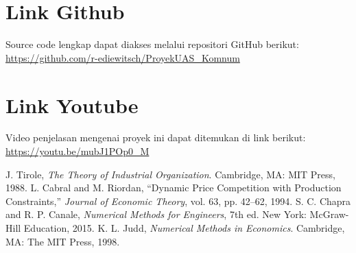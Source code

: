 \documentclass[conference]{IEEEtran}
\begin{document}
\section{Link Github}
Source code lengkap dapat diakses melalui repositori GitHub berikut:
\url{https://github.com/r-ediewitsch/ProyekUAS_Komnum}

\section{Link Youtube}
Video penjelasan mengenai proyek ini dapat ditemukan di link berikut:
\url{https://youtu.be/mubJ1POp0_M}

\begin{thebibliography}{00}
 J. Tirole, \textit{The Theory of Industrial Organization}. Cambridge, MA: MIT Press, 1988.
 L. Cabral and M. Riordan, ``Dynamic Price Competition with Production Constraints,'' \textit{Journal of Economic Theory}, vol. 63, pp. 42--62, 1994.
 S. C. Chapra and R. P. Canale, \textit{Numerical Methods for Engineers}, 7th ed. New York: McGraw-Hill Education, 2015.
 K. L. Judd, \textit{Numerical Methods in Economics}. Cambridge, MA: The MIT Press, 1998.
\end{thebibliography}
\end{document}
